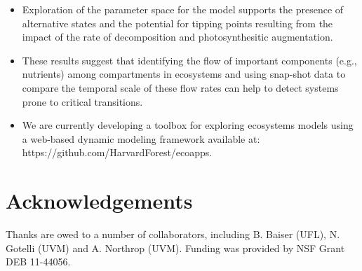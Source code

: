 \documentclass[a0,landscape]{a0poster}
\begin{document}
\begin{multicols}{3}
\begin{itemize}
\item Exploration of the parameter space for the model supports the
  presence of alternative states and the potential for tipping points
  resulting from the impact of the rate of decomposition and
  photosynthesitic augmentation.
\item These results suggest that identifying the flow of important
  components (e.g., nutrients) among compartments in ecosystems and
  using snap-shot data to compare the temporal scale of these flow
  rates can help to detect systems prone to critical transitions.
\item We are currently developing a toolbox for exploring ecosystems
  models using a web-based dynamic modeling framework available at:
  https://github.com/HarvardForest/ecoapps.
\end{itemize}

\color{DarkSlateGray} %







\section*{Acknowledgements}

Thanks are owed to a number of collaborators, including B. Baiser
(UFL), N. Gotelli (UVM) and A. Northrop (UVM). Funding was provided by
NSF Grant DEB 11-44056. 


\vspace{-2cm}

\end{multicols}
\end{document}
